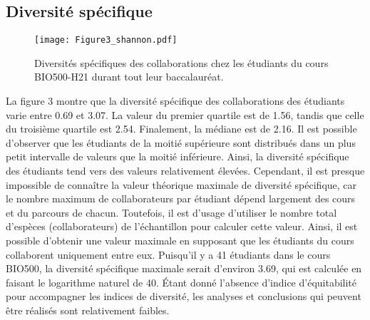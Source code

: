 \documentclass[12pt]{article}
\begin{document}
\begin{multicols}{2}
\subsection{Diversité spécifique}
\begin{figure}[H]
\centering
\texttt{[image: Figure3\_shannon.pdf]}
 \caption{Diversités spécifiques des collaborations chez les étudiants du cours BIO500-H21 durant tout leur baccalauréat.}
 \label{fig3}
\end{figure}
La figure 3 montre que la diversité spécifique des collaborations des étudiants varie entre 0.69 et 3.07. La valeur du premier quartile est de 1.56, tandis que celle du troisième quartile est 2.54. Finalement, la médiane est de 2.16. Il est possible d’observer que les étudiants de la moitié supérieure sont distribués dans un plus petit intervalle de valeurs que la moitié inférieure. Ainsi, la diversité spécifique des étudiants tend vers des valeurs relativement élevées. Cependant, il est presque impossible de connaître la valeur théorique maximale de diversité spécifique, car le nombre maximum de collaborateurs par étudiant dépend largement des cours et du parcours de chacun. Toutefois, il est d’usage d’utiliser le nombre total d’espèces (collaborateurs) de l’échantillon pour calculer cette valeur\cite{REBENT}. Ainsi, il est possible d’obtenir une valeur maximale en supposant que les étudiants du cours collaborent uniquement entre eux. Puisqu’il y a 41 étudiants dans le cours BIO500, la diversité spécifique maximale serait d’environ 3.69, qui est calculée en faisant le logarithme naturel de 40. Étant donné l’absence d’indice d’équitabilité pour accompagner les indices de diversité, les analyses et conclusions qui peuvent être réalisés sont relativement faibles\cite{REBENT}. 

\end{multicols}
\end{document}
